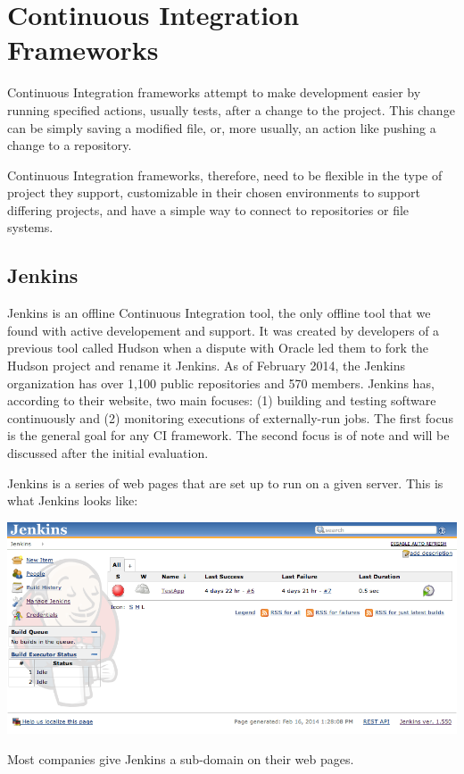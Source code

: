 \documentclass[12pt]{ucthesis}
\newenvironment{Figure}
  {\par\medskip\noindent\minipage{\linewidth}}
  {\endminipage\par\medskip}
\begin{document}
\section{Continuous Integration Frameworks}
Continuous Integration frameworks attempt to make development easier by running specified actions, usually tests, after a change to the project. This change can be simply saving a modified file, or, more usually, an action like pushing a change to a repository.

Continuous Integration frameworks, therefore, need to be flexible in the type of project they support, customizable in their chosen environments to support differing projects, and have a simple way to connect to repositories or file systems.

\subsection{Jenkins}
Jenkins\cite{Jenkins} is an offline Continuous Integration tool, the only offline tool that we found with active developement and support. It was created by developers of a previous tool called Hudson when a dispute with Oracle led them to fork the Hudson project and rename it Jenkins. As of February 2014, the Jenkins organization has over 1,100 public repositories and 570 members\cite{JenkinsGitHub}. Jenkins has, according to their website, two main focuses: (1) building and testing software continuously and (2) monitoring executions of externally-run jobs. The first focus is the general goal for any CI framework. The second focus is of note and will be discussed after the initial evaluation. 

Jenkins is a series of web pages that are set up to run on a given server. This is what Jenkins looks like:
\begin{Figure}
  \centering
  \includegraphics[width=0.95\linewidth]{jenkins.png}
\end{Figure}
Most companies give Jenkins a sub-domain on their web pages.
\end{document}
